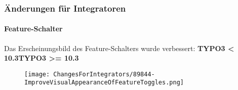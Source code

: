 
\begin{frame}[fragile]
	\frametitle{Änderungen für Integratoren}
	\framesubtitle{Feature-Schalter}

	Das Erscheinungsbild des Feature-Schalters wurde verbessert:
	\newline\newline
	\smaller\textbf{TYPO3 < 10.3}\tabto{6cm}\textbf{TYPO3 >= 10.3}\normalsize

	\begin{figure}
		\texttt{[image: ChangesForIntegrators/89844-ImproveVisualAppearanceOfFeatureToggles.png]}
	\end{figure}

\end{frame}

%
%
%
%
%
%
%
